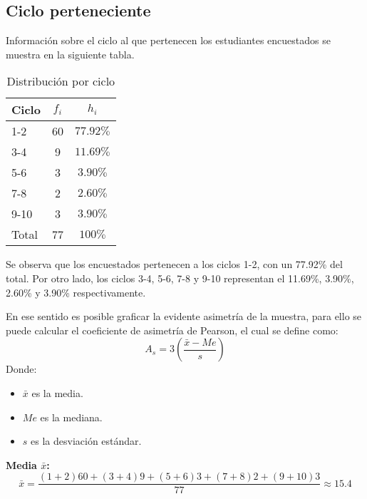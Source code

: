 \subsection{Ciclo perteneciente}

Información sobre el ciclo al que pertenecen los estudiantes encuestados se muestra en la siguiente tabla.

\begin{multicols}{2}
  \begin{minipage}{\linewidth}
    \centering
	\begin{table}[H]
	  \centering
	  \caption{Distribución por ciclo}
	  \renewcommand{\arraystretch}{1.2}
	  \begin{tabular}{l c c }
		\hline
		Ciclo & \(f_i\) & \(h_i\) \\
		\hline
		1-2 & 60 & \(77.92\%\) \\
		3-4 & 9 & \(11.69\%\) \\
		5-6 & 3 & \(3.90\%\) \\
		7-8 & 2 & \(2.60\%\) \\
		9-10 & 3 & \(3.90\%\) \\
		\hline
		Total & 77 & \(100\%\) \\
		\hline
	  \end{tabular}
	\end{table}
  \end{minipage}

  Se observa que los encuestados pertenecen a los ciclos 1-2, con un 77.92\% del total. Por otro lado, los ciclos 3-4, 5-6, 7-8 y 9-10 representan el 11.69\%, 3.90\%, 2.60\% y 3.90\% respectivamente.

  \columnbreak

  En ese sentido es posible graficar la evidente asimetría de la muestra, para ello se puede calcular el coeficiente de asimetría de Pearson, el cual se define como:
  \begin{equation*}
    A_s = 3 \left( \dfrac{\bar{x} - Me}{s} \right)
  \end{equation*}
  Donde:
  \begin{itemize}
    \item \(\bar{x}\) es la media.
    \item \(Me\) es la mediana.
    \item \(s\) es la desviación estándar.
  \end{itemize}
\end{multicols}
\vspace{-0.5cm}  
  \textbf{Media \(\bar{x}\):}
  \begin{equation*}
    \bar{x} = \dfrac{(1+2)60 + (3+4)9 + (5+6)3 + (7+8)2 + (9+10)3}{77} \approx 15.4
  \end{equation*}
